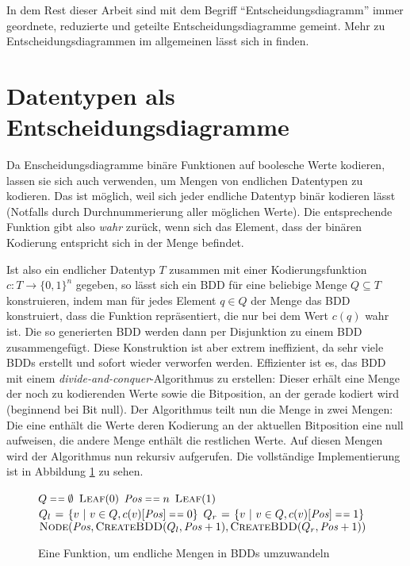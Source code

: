 In dem Rest dieser Arbeit sind mit dem Begriff "`Entscheidungsdiagramm"' immer geordnete, reduzierte und geteilte Entscheidungsdiagramme gemeint.
Mehr zu Entscheidungsdiagrammen im allgemeinen lässt sich in \cite{knuth2011computer} finden.
\section{Datentypen als Entscheidungsdiagramme}
Da Enscheidungsdiagramme binäre Funktionen auf boolesche Werte kodieren, lassen sie sich auch verwenden, um Mengen von endlichen Datentypen zu kodieren.
Das ist möglich, weil sich jeder endliche Datentyp binär kodieren lässt (Notfalls durch Durchnummerierung aller möglichen Werte).
Die entsprechende Funktion gibt also \emph{wahr} zurück, wenn sich das Element, dass der binären Kodierung entspricht sich in der Menge befindet.

Ist also ein endlicher Datentyp $T$ zusammen mit einer Kodierungsfunktion $c : T\rightarrow \{0,1\}^n$ gegeben, so lässt sich ein BDD für eine beliebige Menge $Q\subseteq T$ konstruieren, indem man für jedes Element $q\in Q$ der Menge das BDD konstruiert, dass die Funktion repräsentiert, die nur bei dem Wert $c(q)$ wahr ist.
Die so generierten BDD werden dann per Disjunktion zu einem BDD zusammengefügt.
Diese Konstruktion ist aber extrem ineffizient, da sehr viele BDDs erstellt und sofort wieder verworfen werden.
Effizienter ist es, das BDD mit einem \emph{divide-and-conquer}-Algorithmus zu erstellen:
Dieser erhält eine Menge der noch zu kodierenden Werte sowie die Bitposition, an der gerade kodiert wird (beginnend bei Bit null).
Der Algorithmus teilt nun die Menge in zwei Mengen:
Die eine enthält die Werte deren Kodierung an der aktuellen Bitposition eine null aufweisen, die andere Menge enthält die restlichen Werte.
Auf diesen Mengen wird der Algorithmus nun rekursiv aufgerufen.
Die vollständige Implementierung ist in Abbildung \ref{alg:create_bdd} zu sehen.

\begin{figure}[h]
\centering
\begin{codebox}
\li \If $Q\isequal\emptyset$\Then
\li \Return $\textnormal{\scshape Leaf}(0)$
\End
\li \If $\id{Pos}\isequal n$\Then
\li \Return $\textnormal{\scshape Leaf}(1)$
\End
\li $Q_l\gets \{ v\ |\ v\in Q, c(v)[\id{Pos}]\isequal 0 \}$
\li $Q_r\gets \{ v\ |\ v\in Q, c(v)[\id{Pos}]\isequal 1 \}$
\li \Return $\proc{Node}(\id{Pos},\proc{CreateBDD}(Q_l,\id{Pos}+1),\proc{CreateBDD}(Q_r,\id{Pos}+1))$
\end{codebox}
\caption{Eine Funktion, um endliche Mengen in BDDs umzuwandeln}
\label{alg:create_bdd}
\end{figure}

